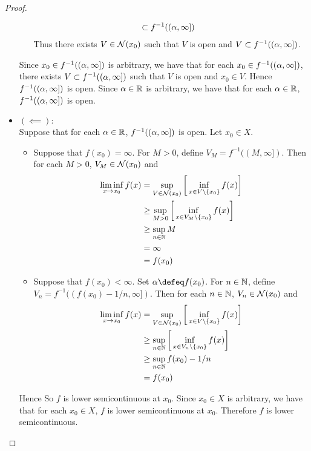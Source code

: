 \documentclass{book}
\begin{document}
\begin{proof}
\begin{itemize}
\begin{itemize}
\begin{align*}
				&\subset f^{-1}((\alpha, \infty])
			\end{align*} 
			Thus there exists $V \in \mathcal{N}(x_0)$ such that $V$ is open and $V \subset f^{-1}((\alpha, \infty])$.
		\end{itemize}
		Since $x_0 \in f^{-1}((\alpha, \infty])$ is arbitrary, we have that for each $x_0 \in f^{-1}((\alpha, \infty])$, there exists $V \subset f^{-1}((\alpha, \infty])$ such that $V$ is open and $x_0 \in V$. Hence $f^{-1}((\alpha, \infty])$ is open. Since $\alpha \in \mathbb{R}$ is arbitrary, we have that for each $\alpha \in \mathbb{R}$, $f^{-1}((\alpha, \infty])$ is open.
		\item $(\impliedby):$ \\ 
		Suppose that for each $\alpha \in \mathbb{R}$, $f^{-1}((\alpha, \infty])$ is open. Let $x_0 \in X$. 
		\begin{itemize}
			\item Suppose that $f(x_0) = \infty$.  For $M > 0$, define $V_M = f^{-1}((M, \infty]) $. Then for each $M > 0$, $V_M \in \mathcal{N}(x_0)$ and 
			\begin{align*}
				\liminf_{x \rightarrow x_0} f(x) 
				&= \sup_{V \in \mathcal{N}(x_0)} \bigg[ \inf_{x \in V \setminus \{x_0\}} f(x) \bigg] \\
				& \geq \sup_{M > 0} \bigg[ \inf_{x \in V_M \setminus \{x_0\}} f(x) \bigg] \\
				& \geq \sup_{n \in \mathbb{N}} M \\
				& = \infty \\
				&= f(x_0) 
			\end{align*}
			\item Suppose that $f(x_0) < \infty$. Set $\al \defeq f(x_0)$. For $n \in \mathbb{N}$, define $V_n = f^{-1}((f(x_0)-1/n, \infty]) $. Then for each $n \in \mathbb{N}$, $V_n \in \mathcal{N}(x_0)$ and 
			\begin{align*}
				\liminf_{x \rightarrow x_0} f(x) 
				&= \sup_{V \in \mathcal{N}(x_0)} \bigg[ \inf_{x \in V \setminus \{x_0\}} f(x) \bigg] \\
				& \geq \sup_{n \in \mathbb{N}} \bigg[ \inf_{x \in V_n \setminus \{x_0\}} f(x) \bigg] \\
				& \geq \sup_{n \in \mathbb{N}} f(x_0)-1/n \\
				&= f(x_0) 
			\end{align*}
		\end{itemize}
		Hence So $f$ is lower semicontinuous at $x_0$. Since $x_0 \in X$ is arbitrary, we have that for each $x_0 \in X$, $f$ is lower semicontinuous at $x_0$. Therefore $f$ is lower semicontinuous.
	\end{itemize}
	\end{proof}
\end{document}
